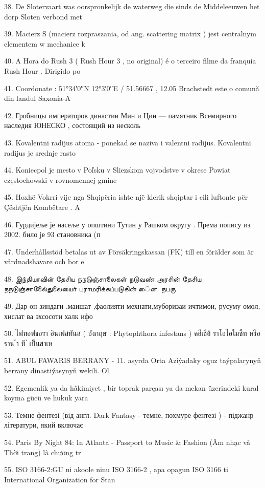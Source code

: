 38. De Slotervaart was oorspronkelijk de waterweg die sinds de Middeleeuwen het dorp
Sloten verbond met

39. Macierz S (macierz rozpraszania, od ang. scattering matrix ) jest centralnym elementem
w mechanice k

40. A Hora do Rush 3 ( Rush Hour 3 , no original) é o terceiro filme da franquia Rush Hour
. Dirigido po

41. Coordonate : 51°34′0″N 12°3′0″E / 51.56667 , 12.05 Brachstedt este o comună din
landul Saxonia-A

42. Гробницы императоров династии Мин и Цин --- памятник Всемирного наследия
ЮНЕСКО , состоящий из несколь

43. Kovalentni radijus atoma - ponekad se naziva i valentni radijus. Kovalentni radijus je
srednje rasto

44. Koniecpol je mesto v Poľsku v Sliezskom vojvodstve v okrese Powiat częstochowski v
rovnomennej gmine

45. Hoxhë Vokrri vije nga Shqipëria ishte një klerik shqiptar i cili luftonte për Çështjën
Kombëtare . A

46. Гурдијеље је насеље у општини Тутин у Рашком округу . Према попису из 2002.
било је 93 становника (п

47. Underhållsstöd betalas ut av Försäkringskassan (FK) till en förälder som är
vårdnadshavare och bor e

48. இந்தியாவின் தேசிய நநடுஞ்சாலைகள் நடுவண் அரசின் தேசிய
நநடுஞ்சாலைே்துலையாை் பராமரிக்கப்படுகின் ைன. நபரு

49. Дар он зиндаги .маишат ,фаолияти мехнати,муборизаи ичтимои, русуму омол,
хислат ва эхсосоти халк ифо

50. ไฟทอฟธอรา อินเฟสทันส ( อังกฤษ : Phytophthora infestans ) คอืเชือ้ ราโอโอไมซีท หรือ ราน
้า
ที
่
เป็นสาเห

51. ABUL FAWARIS BERRANY - 11. asyrda Orta Aziýadaky oguz taýpalarynyň berrany
dinastiýasynyň wekili. Ol

52. Egemenlik ya da hâkimiyet , bir toprak parçası ya da mekan üzerindeki kural koyma
gücü ve hukuk yara

53. Темне фентезі (від англ. Dark Fantasy - темне, похмуре фентезі ) - піджанр
літератури, який включає

54. Paris By Night 84: In Atlanta - Passport to Music & Fashion (Âm nhạc và Thời trang) là
chương tr

55. ISO 3166-2:GU ni akoole ninu ISO 3166-2 , apa opagun ISO 3166 ti International
Organization for Stan

